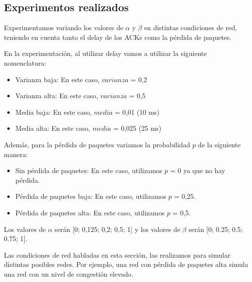 \subsection{Experimentos realizados}
Experimentamos variando los valores de $\alpha$ y $\beta$ en distintas condiciones de red, teniendo en cuenta tanto el delay de los ACKs como la pérdida de paquetes.

En la experimentación, al utilizar delay vamos a utilizar la siguiente nomenclatura:
\begin{itemize}
 \item Varianza baja: En este caso, $varianza$ = 0,2
 \item Varianza alta: En este caso, $varianza$ = 0,5
 \item Media baja: En este caso, $media$ = 0,01 (10 ms)
 \item Media alta: En este caso, $media$ = 0,025 (25 ms)
\end{itemize}
 
Además, para la pérdida de paquetes variamos la probabilidad $p$ de la siguiente manera:
\begin{itemize}
 \item Sin pérdida de paquetes: En este caso, utilizamos $p$ = 0 ya que no hay pérdida. 
 \item Pérdida de paquetes baja: En este caso, utilizamos $p$ = 0,25.
 \item Pérdida de paquetes alta: En este caso, utilizamos $p$ = 0,5.
\end{itemize}

Los valores de $\alpha$ serán [0; 0,125; 0,2; 0,5; 1] y los valores de $\beta$ serán [0; 0.25; 0.5; 0.75; 1].

Las condiciones de red habladas en esta sección, las realizamos para simular distintas posibles redes. Por ejemplo, una red con pérdida de paquetes alta simula una red con un nivel de congestión elevado.